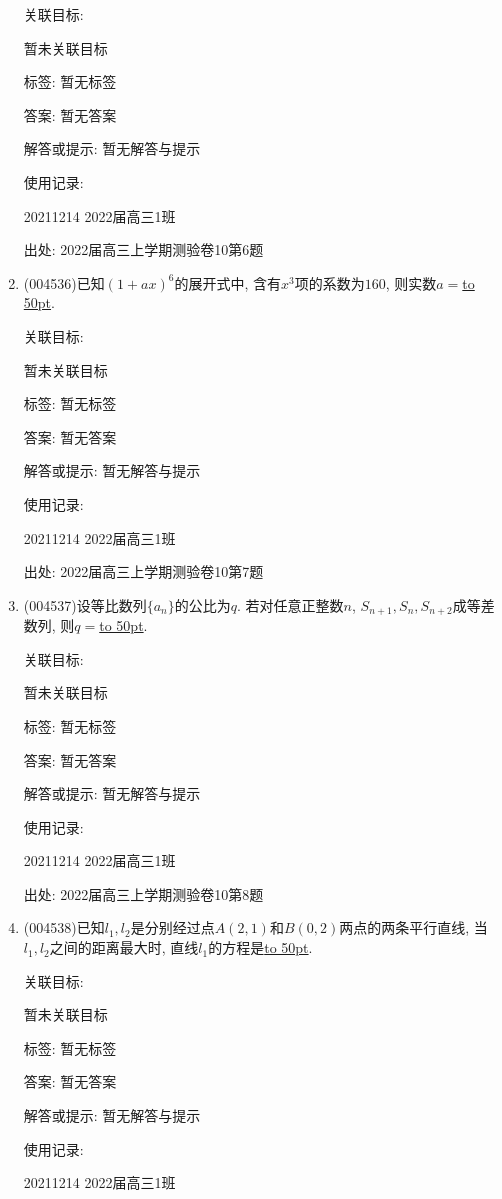 \documentclass[10pt,a4paper]{article}
\newcommand{\blank}[1]{\underline{\hbox to #1pt{}}}
\begin{document}
\begin{enumerate}[1.]
关联目标:

暂未关联目标



标签: 暂无标签

答案: 暂无答案

解答或提示: 暂无解答与提示

使用记录:

20211214	2022届高三1班	


出处: 2022届高三上学期测验卷10第6题
\item { (004536)}已知$(1+ax)^6$的展开式中, 含有$x^3$项的系数为$160$, 则实数$a=$\blank{50}.


关联目标:

暂未关联目标



标签: 暂无标签

答案: 暂无答案

解答或提示: 暂无解答与提示

使用记录:

20211214	2022届高三1班	


出处: 2022届高三上学期测验卷10第7题
\item { (004537)}设等比数列$\{a_n\}$的公比为$q$. 若对任意正整数$n$, $S_{n+1},S_n,S_{n+2}$成等差数列, 则$q=$\blank{50}.


关联目标:

暂未关联目标



标签: 暂无标签

答案: 暂无答案

解答或提示: 暂无解答与提示

使用记录:

20211214	2022届高三1班	


出处: 2022届高三上学期测验卷10第8题
\item { (004538)}已知$l_1,l_2$是分别经过点$A(2,1)$和$B(0,2)$两点的两条平行直线, 当$l_1,l_2$之间的距离最大时, 直线$l_1$的方程是\blank{50}.


关联目标:

暂未关联目标



标签: 暂无标签

答案: 暂无答案

解答或提示: 暂无解答与提示

使用记录:

20211214	2022届高三1班	



\end{enumerate}
\end{document}
